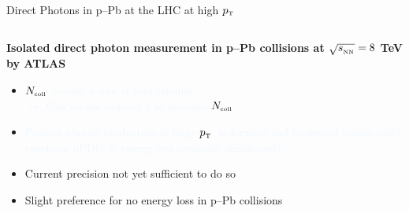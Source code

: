 \documentclass[aspectratio=169,10pt]{beamer}
\newcommand{\pT}          {\ensuremath{p_{\mbox{\tiny T}}}}
\newcommand{\Ncoll}       {\ensuremath{N_{\mbox{\tiny coll}}}}
\begin{document}
    \begin{frame}{Direct Photons in p--Pb at the LHC at high \pT}
    \begin{columns}
        \begin{column}{5.4cm}
          \textbf{Isolated direct photon measurement in p--Pb collisions at $\sqrt{s_{_{\text{\tiny NN}}}} = 8$ TeV by ATLAS } \vspace{0.3cm}
          \begin{itemize}
          \item \textcolor{AliceBlue}{\Ncoll\ scaling works at mid rapidity} \\
                \textcolor{AliceBlue}{$\Rightarrow$ Can we use isolated $\gamma$ to measure \Ncoll?}
          \item \textcolor{AliceBlue}{Prompt photon production at large \pT\ in forward and backward region could constrain nPDFs \& energy loss scenarios significantly}
          \item Current precision not yet sufficient to do so
          \item Slight preference for no energy loss in p--Pb collisions
          \end{itemize}


\end{column}
\end{columns}
\end{frame}
\end{document}

